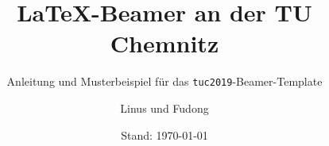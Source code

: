 
\usepackage{ifxetex}
\usepackage{ifluatex}
\ifxetex
\usepackage[babelshorthands]{polyglossia}
\setmainlanguage{german}
\else\ifluatex
\usepackage[babelshorthands]{polyglossia}
\setmainlanguage{german}
\else
\usepackage[T1]{fontenc}
\usepackage[utf8]{inputenc}
\usepackage[ngerman]{babel}
\usepackage{listingsutf8}
\fi\fi
\usepackage{url}
\usepackage{tikz}
\usepackage{amsmath}
\usepackage{exscale}
\usepackage{listings}
\usepackage{textcomp}
\usepackage{chemfig}
\usepackage{metalogo}
\usepackage{tabularx}
\usepackage{framed}
\graphicspath{ {./bilder} }


\def\UrlBreaks{\do\:\do\.\do\@\do\\\do\/\do\!\do\_\do\|\do\;\do\>\do\]%
 \do\)\do\,\do\?\do\'\do+\do\=\do\#}
\def\UrlBigBreaks{}



\title{\LaTeX-Beamer an der TU Chemnitz}
\subtitle[Anleitung und Musterbeispiel]{Anleitung und Musterbeispiel für das \texttt{tuc2019}-Beamer-Template}
\author{Linus und Fudong}
\date[\today]{Stand: \today}




